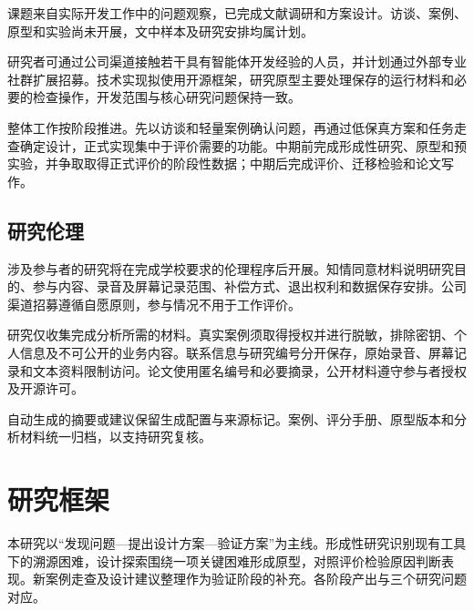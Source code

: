 课题来自实际开发工作中的问题观察，已完成文献调研和方案设计。访谈、案例、原型和实验尚未开展，文中样本及研究安排均属计划。

研究者可通过公司渠道接触若干具有智能体开发经验的人员，并计划通过外部专业社群扩展招募。技术实现拟使用开源框架，研究原型主要处理保存的运行材料和必要的检查操作，开发范围与核心研究问题保持一致。

整体工作按阶段推进。先以访谈和轻量案例确认问题，再通过低保真方案和任务走查确定设计，正式实现集中于评价需要的功能。中期前完成形成性研究、原型和预实验，并争取取得正式评价的阶段性数据；中期后完成评价、迁移检验和论文写作。

\subsection{研究伦理}

涉及参与者的研究将在完成学校要求的伦理程序后开展。知情同意材料说明研究目的、参与内容、录音及屏幕记录范围、补偿方式、退出权利和数据保存安排。公司渠道招募遵循自愿原则，参与情况不用于工作评价。

研究仅收集完成分析所需的材料。真实案例须取得授权并进行脱敏，排除密钥、个人信息及不可公开的业务内容。联系信息与研究编号分开保存，原始录音、屏幕记录和文本资料限制访问。论文使用匿名编号和必要摘录，公开材料遵守参与者授权及开源许可。

自动生成的摘要或建议保留生成配置与来源标记。案例、评分手册、原型版本和分析材料统一归档，以支持研究复核。

\section{研究框架}

本研究以“发现问题—提出设计方案—验证方案”为主线。形成性研究识别现有工具下的溯源困难，设计探索围绕一项关键困难形成原型，对照评价检验原因判断表现。新案例走查及设计建议整理作为验证阶段的补充。各阶段产出与三个研究问题对应。

